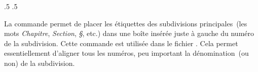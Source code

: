 \begin{noprint}
\newlength{\toclabelwidth}
	\settowidth{\toclabelwidth}{\cftchapterfont\chaptername\space}
\newlength{\tocnumwidth}
\if@article
	\settowidth{\tocnumwidth}{\cftsectionfont XX\space}
\else
	\settowidth{\tocnumwidth}{\cftchapterfont XXX\space}
\fi
\newlength{\toccenterwidth}
	\setlength{\toccenterwidth}{\tocnumwidth}
	\addtolength{\toccenterwidth}{\toclabelwidth}
\end{noprint}

\begin{noprint}
	{\if@article\tocnumwidth\else.5\tocnumwidth\fi}
	{\if@article\tocnumwidth\else.5\tocnumwidth\fi}
\end{noprint}

\begin{developer}
La commande  permet de placer les étiquettes des subdivisions principales~(les mots \emph{Chapitre}, \emph{Section}, \emph{§}, etc.) dans une boîte insérée juste à gauche du numéro de la subdivision. Cette commande est utilisée dans le fichier . Cela permet essentiellement d'aligner tous les numéros, peu important la dénomination~(ou non) de la subdivision.
\end{developer}

\begin{noprint}
\newcommand{\toclabelbox}[1]{\makebox[\toclabelwidth]{\hfill\llap{#1\normalsize\space}}}
\end{noprint}


